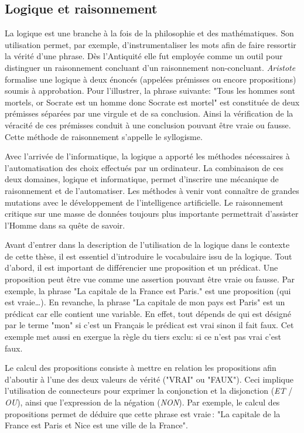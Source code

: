 \begin{refsegment}
    \subsection{Logique et raisonnement}
    
    La logique est une branche à la fois de la philosophie et des mathématiques. Son utilisation permet, par exemple, d'instrumentaliser les mots afin de faire ressortir la vérité d'une phrase. Dès l'Antiquité elle fut employée comme un outil pour distinguer un raisonnement concluant d'un raisonnement non-concluant. \textit{Aristote} formalise une logique à deux énoncés (appelées prémisses ou encore propositions) soumis à approbation. Pour l'illustrer, la phrase suivante: "Tous les hommes sont mortels, or Socrate est un homme donc Socrate est mortel" est constituée de deux prémisses séparées par une virgule et de sa conclusion. Ainsi la vérification de la véracité de ces prémisses conduit à une conclusion pouvant être vraie ou fausse. Cette méthode de raisonnement s'appelle le syllogisme.
    
    Avec l'arrivée de l'informatique, la logique a apporté les méthodes nécessaires à l'automatisation des choix effectués par un ordinateur. La combinaison de ces deux domaines, logique et informatique, permet d'inscrire une mécanique de raisonnement et de l'automatiser. Les méthodes à venir vont connaître de grandes mutations avec le développement de l'intelligence artificielle. Le raisonnement critique sur une masse de données toujours plus importante permettrait d'assister l'Homme dans sa quête de savoir.
    
    
    Avant d'entrer dans la description de l'utilisation de la logique dans le contexte de cette thèse, il est essentiel d'introduire le vocabulaire issu de la logique. Tout d'abord, il est important de différencier une proposition et un prédicat.  Une proposition peut être vue comme une assertion pouvant être vraie ou fausse. Par exemple, la phrase "La capitale de la France est Paris." est une proposition (qui est vraie\ldots). En revanche, la phrase "La capitale de mon pays est Paris" est un prédicat car elle contient une variable. En effet, tout dépends de qui est désigné par le terme "mon" si c'est un Français le prédicat est vrai sinon il fait faux. Cet exemple met aussi en exergue la règle du tiers exclu: si ce n'est pas vrai c'est faux.
    
    Le calcul des propositions consiste à mettre en relation les propositions afin d'aboutir à l'une des deux valeurs de vérité ("VRAI" ou "FAUX"). Ceci implique l'utilisation de connecteurs pour exprimer la conjonction et la disjonction (\textit{ET} / \textit{OU}), ainsi que l'expression de la négation (\textit{NON}). Par exemple, le calcul des propositions permet de déduire que cette phrase est vraie : "La capitale de la France est Paris et Nice est une ville de la France".
    

\end{refsegment}

